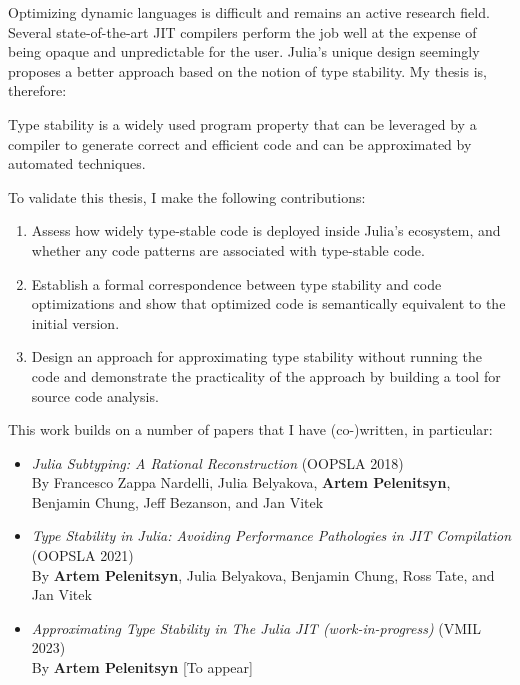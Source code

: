 Optimizing dynamic languages is difficult and remains an active research field.
Several state-of-the-art JIT compilers perform the job well at the expense of being
opaque and unpredictable for the user.
Julia's unique design seemingly proposes a better approach based on the notion
of type stability. My thesis is, therefore:

\begin{itquote}
Type stability
is a widely used program property that can be leveraged by a compiler to generate
correct and efficient code
and can be approximated by automated techniques.
\end{itquote}

To validate this thesis, I make the following contributions:
\begin{enumerate}

  \item
  Assess how widely type-stable code is deployed inside Julia's ecosystem, and
  whether any code patterns are associated with type-stable code.

  \item
  Establish a formal correspondence between type stability and code optimizations and
  show that optimized code is semantically equivalent to the initial version.

  \item
  Design an approach for approximating type stability without running the code and
  demonstrate the practicality of the approach by building a tool for source code analysis.
\end{enumerate}


This work builds on a number of papers that I have (co-)written, in particular:
\begin{itemize}
  \item \emph{Julia Subtyping: A Rational Reconstruction} (OOPSLA 2018)\\
  By Francesco Zappa Nardelli, Julia Belyakova, \textbf{Artem Pelenitsyn},
  Benjamin Chung, Jeff Bezanson, and Jan Vitek~\cite{oopsla18b}

  \item \emph{Type Stability in Julia: Avoiding Performance Pathologies in JIT
  Compilation} (OOPSLA 2021)\\
  By \textbf{Artem Pelenitsyn}, Julia Belyakova, Benjamin Chung, Ross Tate, and Jan
  Vitek~\cite{Pelenitsyn21}

  \item \emph{Approximating Type Stability in The Julia JIT (work-in-progress)} (VMIL 2023)\\
  By \textbf{Artem Pelenitsyn} [To appear]
\end{itemize}
